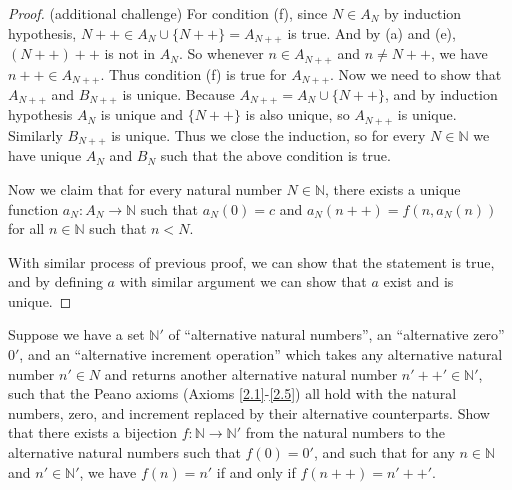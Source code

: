 \begin{proof}{(additional challenge)}
For condition (f), since \(N \in A_N\) by induction hypothesis, \(N++ \in A_N \cup \{N++\} = A_{N++}\) is true.
And by (a) and (e), \((N++)++\) is not in \(A_N\).
So whenever \(n \in A_{N++}\) and \(n \neq N++\), we have \(n++ \in A_{N++}\).
Thus condition (f) is true for \(A_{N++}\).
Now we need to show that \(A_{N++}\) and \(B_{N++}\) is unique.
Because \(A_{N++} = A_N \cup \{N++\}\), and by induction hypothesis \(A_N\) is unique and \(\{N++\}\) is also unique, so \(A_{N++}\) is unique.
Similarly \(B_{N++}\) is unique.
Thus we close the induction, so for every \(N \in \mathds{N}\) we have unique \(A_N\) and \(B_N\) such that the above condition is true.

Now we claim that for every natural number \(N \in \mathds{N}\), there exists a unique function \(a_N : A_N \to \mathds{N}\) such that \(a_N(0) = c\) and \(a_N(n++) = f(n, a_{N}(n))\) for all \(n \in \mathds{N}\) such that \(n < N\).

With similar process of previous proof, we can show that the statement is true, and by defining \(a\) with similar argument we can show that \(a\) exist and is unique.
\end{proof}

\begin{exercise}\label{ex 3.5.13}
Suppose we have a set \(\mathds{N}'\) of ``alternative natural numbers'', an ``alternative zero'' \(0'\), and an ``alternative increment operation'' which takes any alternative natural number \(n' \in N\) and returns another alternative natural number \(n'++' \in \mathds{N}'\), such that the Peano axioms (Axioms \ref{2.1}-\ref{2.5}) all hold with the natural numbers, zero, and increment replaced by their alternative counterparts.
Show that there exists a bijection \(f : \mathds{N} \to \mathds{N}'\) from the natural numbers to the alternative natural numbers such that \(f(0) = 0'\), and such that for any \(n \in \mathds{N}\) and \(n' \in \mathds{N}'\), we have \(f(n) = n'\) if and only if \(f(n++) = n'++'\).
\end{exercise}

